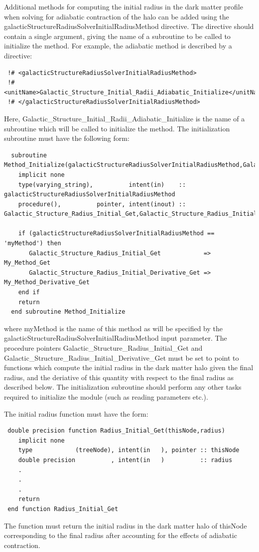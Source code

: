 Additional methods for computing the initial radius in the dark matter profile when solving for adiabatic contraction of the halo can be added using the {\normalfont \ttfamily galacticStructureRadiusSolverInitialRadiusMethod} directive. The directive should contain a single argument, giving the name of a subroutine to be called to initialize the method. For example, the {\normalfont \ttfamily adiabatic} method is described by a directive:
\begin{verbatim}
 !# <galacticStructureRadiusSolverInitialRadiusMethod>
 !#  <unitName>Galactic_Structure_Initial_Radii_Adiabatic_Initialize</unitName>
 !# </galacticStructureRadiusSolverInitialRadiusMethod>
\end{verbatim}
Here, {\normalfont \ttfamily Galactic\_Structure\_Initial\_Radii\_Adiabatic\_Initialize} is the name of a subroutine which will be called to initialize the method. The initialization subroutine must have the following form:
\begin{verbatim}
  subroutine Method_Initialize(galacticStructureRadiusSolverInitialRadiusMethod,Galactic_Structure_Radius_Initial_Get,Galactic_Structure_Radius_Initial_Derivative_Get)
    implicit none
    type(varying_string),          intent(in)    :: galacticStructureRadiusSolverInitialRadiusMethod
    procedure(),          pointer, intent(inout) :: Galactic_Structure_Radius_Initial_Get,Galactic_Structure_Radius_Initial_Derivative_Get
    
    if (galacticStructureRadiusSolverInitialRadiusMethod == 'myMethod') then
       Galactic_Structure_Radius_Initial_Get            => My_Method_Get
       Galactic_Structure_Radius_Initial_Derivative_Get => My_Method_Derivative_Get
    end if
    return
  end subroutine Method_Initialize
\end{verbatim}
where {\normalfont \ttfamily myMethod} is the name of this method as will be specified by the {\normalfont \ttfamily galacticStructureRadiusSolverInitialRadiusMethod} input parameter. The procedure pointers {\normalfont \ttfamily Galactic\_Structure\_Radius\_Initial\_Get} and {\normalfont \ttfamily Galactic\_Structure\_Radius\_Initial\_Derivative\_Get} must be set to point to functions which compute the initial radius in the dark matter halo given the final radius, and the deriative of this quantity with respect to the final radius as described below. The initialization subroutine should perform any other tasks required to initialize the module (such as reading parameters etc.).

The initial radius function must have the form:
\begin{verbatim}
 double precision function Radius_Initial_Get(thisNode,radius)
    implicit none
    type            (treeNode), intent(in   ), pointer :: thisNode
    double precision          , intent(in   )          :: radius
    .
    .
    .
    return
 end function Radius_Initial_Get
\end{verbatim}
The function must return the initial radius in the dark matter halo of {\normalfont \ttfamily thisNode} corresponding to the final {\normalfont \ttfamily radius} after accounting for the effects of adiabatic contraction.

